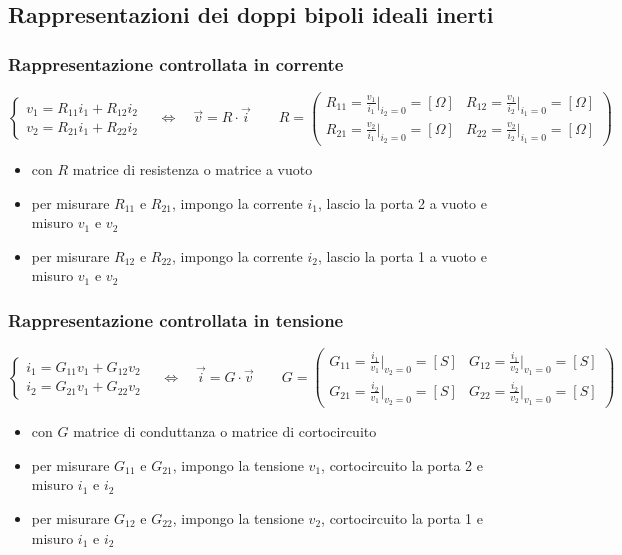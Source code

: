\documentclass[a4paper]{article}
\begin{document}
\subsection{Rappresentazioni dei doppi bipoli ideali inerti}
\subsubsection*{Rappresentazione controllata in corrente}
\[\begin{cases}
	v_1 = R_{11} i_1 + R_{12} i_2 \\
	v_2 = R_{21} i_1 + R_{22} i_2
\end{cases} \quad \Leftrightarrow \quad
\vec{v} = R \cdot \vec{i} \qquad
R = \left( \begin{matrix}
	R_{11} = \frac{v_1}{i_1} \Big|_{i_2=0} = [\Omega] & R_{12} = \frac{v_1}{i_2} \Big|_{i_1=0} = [\Omega] \\[8pt]
	R_{21} = \frac{v_2}{i_1} \Big|_{i_2=0} = [\Omega] & R_{22} = \frac{v_2}{i_2} \Big|_{i_1=0} = [\Omega]
\end{matrix} \right)\]
\begin{itemize}
	\item con \(R\) matrice di resistenza o matrice a vuoto
	\item per misurare \(R_{11}\) e \(R_{21}\), impongo la corrente \(i_1\), lascio la porta 2 a vuoto e misuro \(v_1\) e \(v_2\)
	\item per misurare \(R_{12}\) e \(R_{22}\), impongo la corrente \(i_2\), lascio la porta 1 a vuoto e misuro \(v_1\) e \(v_2\)
\end{itemize}

\subsubsection*{Rappresentazione controllata in tensione}
\[\begin{cases}
	i_1 = G_{11} v_1 + G_{12} v_2 \\
	i_2 = G_{21} v_1 + G_{22} v_2
\end{cases} \quad \Leftrightarrow \quad
\vec{i} = G \cdot \vec{v} \qquad
G = \left( \begin{matrix}
	G_{11} = \frac{i_1}{v_1} \Big|_{v_2=0} = [S] & G_{12} = \frac{i_1}{v_2} \Big|_{v_1=0} = [S] \\[8pt]
	G_{21} = \frac{i_2}{v_1} \Big|_{v_2=0} = [S] & G_{22} = \frac{i_2}{v_2} \Big|_{v_1=0} = [S]
\end{matrix} \right)\]
\begin{itemize}
	\item con \(G\) matrice di conduttanza o matrice di cortocircuito
	\item per misurare \(G_{11}\) e \(G_{21}\), impongo la tensione \(v_1\), cortocircuito la porta 2 e misuro \(i_1\) e \(i_2\)
	\item per misurare \(G_{12}\) e \(G_{22}\), impongo la tensione \(v_2\), cortocircuito la porta 1 e misuro \(i_1\) e \(i_2\)
\end{itemize}
\end{document}
